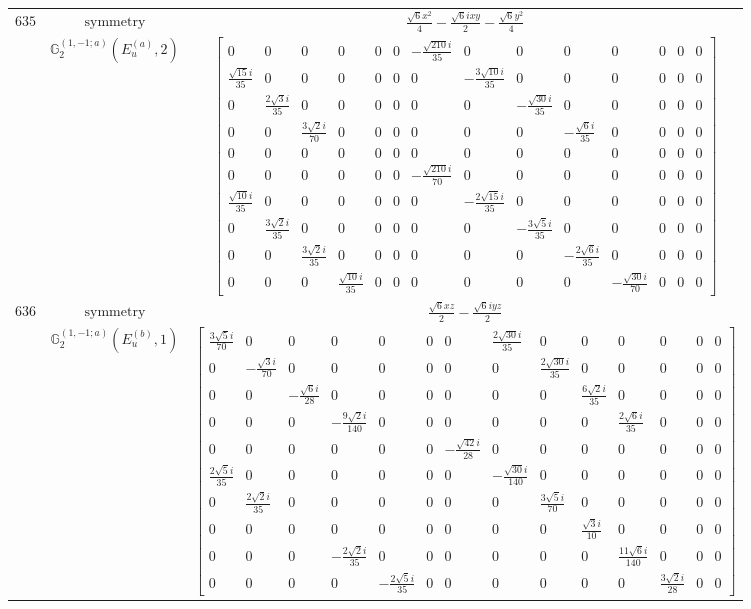 \documentclass[fleqn,8pt,landscape]{jsarticle}
\begin{document}
\begin{longtable}{ccc}
$ 635 $ & $ \text{symmetry} $ & $ \frac{\sqrt{6} x^{2}}{4} - \frac{\sqrt{6} i x y}{2} - \frac{\sqrt{6} y^{2}}{4} $ \\
$  $ & $ \mathbb{G}_{2}^{(1,-1;a)}(E_{u}^{(a)},2) $ & $ \begin{bmatrix} 0 & 0 & 0 & 0 & 0 & 0 & - \frac{\sqrt{210} i}{35} & 0 & 0 & 0 & 0 & 0 & 0 & 0 \\ \frac{\sqrt{15} i}{35} & 0 & 0 & 0 & 0 & 0 & 0 & - \frac{3 \sqrt{10} i}{35} & 0 & 0 & 0 & 0 & 0 & 0 \\ 0 & \frac{2 \sqrt{3} i}{35} & 0 & 0 & 0 & 0 & 0 & 0 & - \frac{\sqrt{30} i}{35} & 0 & 0 & 0 & 0 & 0 \\ 0 & 0 & \frac{3 \sqrt{2} i}{70} & 0 & 0 & 0 & 0 & 0 & 0 & - \frac{\sqrt{6} i}{35} & 0 & 0 & 0 & 0 \\ 0 & 0 & 0 & 0 & 0 & 0 & 0 & 0 & 0 & 0 & 0 & 0 & 0 & 0 \\ 0 & 0 & 0 & 0 & 0 & 0 & - \frac{\sqrt{210} i}{70} & 0 & 0 & 0 & 0 & 0 & 0 & 0 \\ \frac{\sqrt{10} i}{35} & 0 & 0 & 0 & 0 & 0 & 0 & - \frac{2 \sqrt{15} i}{35} & 0 & 0 & 0 & 0 & 0 & 0 \\ 0 & \frac{3 \sqrt{2} i}{35} & 0 & 0 & 0 & 0 & 0 & 0 & - \frac{3 \sqrt{5} i}{35} & 0 & 0 & 0 & 0 & 0 \\ 0 & 0 & \frac{3 \sqrt{2} i}{35} & 0 & 0 & 0 & 0 & 0 & 0 & - \frac{2 \sqrt{6} i}{35} & 0 & 0 & 0 & 0 \\ 0 & 0 & 0 & \frac{\sqrt{10} i}{35} & 0 & 0 & 0 & 0 & 0 & 0 & - \frac{\sqrt{30} i}{70} & 0 & 0 & 0 \end{bmatrix} $ \\ \hline
$ 636 $ & $ \text{symmetry} $ & $ \frac{\sqrt{6} x z}{2} - \frac{\sqrt{6} i y z}{2} $ \\
$  $ & $ \mathbb{G}_{2}^{(1,-1;a)}(E_{u}^{(b)},1) $ & $ \begin{bmatrix} \frac{3 \sqrt{5} i}{70} & 0 & 0 & 0 & 0 & 0 & 0 & \frac{2 \sqrt{30} i}{35} & 0 & 0 & 0 & 0 & 0 & 0 \\ 0 & - \frac{\sqrt{3} i}{70} & 0 & 0 & 0 & 0 & 0 & 0 & \frac{2 \sqrt{30} i}{35} & 0 & 0 & 0 & 0 & 0 \\ 0 & 0 & - \frac{\sqrt{6} i}{28} & 0 & 0 & 0 & 0 & 0 & 0 & \frac{6 \sqrt{2} i}{35} & 0 & 0 & 0 & 0 \\ 0 & 0 & 0 & - \frac{9 \sqrt{2} i}{140} & 0 & 0 & 0 & 0 & 0 & 0 & \frac{2 \sqrt{6} i}{35} & 0 & 0 & 0 \\ 0 & 0 & 0 & 0 & 0 & 0 & - \frac{\sqrt{42} i}{28} & 0 & 0 & 0 & 0 & 0 & 0 & 0 \\ \frac{2 \sqrt{5} i}{35} & 0 & 0 & 0 & 0 & 0 & 0 & - \frac{\sqrt{30} i}{140} & 0 & 0 & 0 & 0 & 0 & 0 \\ 0 & \frac{2 \sqrt{2} i}{35} & 0 & 0 & 0 & 0 & 0 & 0 & \frac{3 \sqrt{5} i}{70} & 0 & 0 & 0 & 0 & 0 \\ 0 & 0 & 0 & 0 & 0 & 0 & 0 & 0 & 0 & \frac{\sqrt{3} i}{10} & 0 & 0 & 0 & 0 \\ 0 & 0 & 0 & - \frac{2 \sqrt{2} i}{35} & 0 & 0 & 0 & 0 & 0 & 0 & \frac{11 \sqrt{6} i}{140} & 0 & 0 & 0 \\ 0 & 0 & 0 & 0 & - \frac{2 \sqrt{5} i}{35} & 0 & 0 & 0 & 0 & 0 & 0 & \frac{3 \sqrt{2} i}{28} & 0 & 0 \end{bmatrix} $ \\ \hline

\end{longtable}
\end{document}
